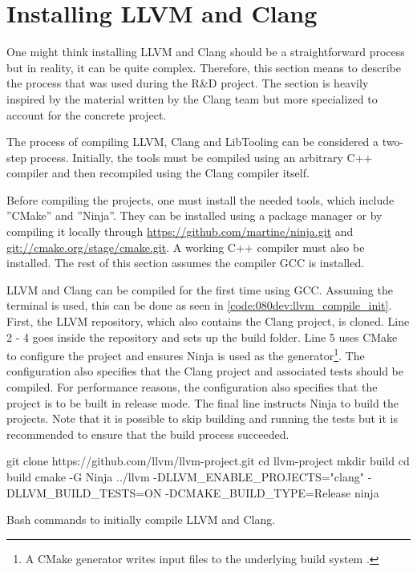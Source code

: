 \section{Installing LLVM and Clang}
One might think installing LLVM and Clang should be a straightforward process but in reality, it can be quite complex. Therefore, this section means to describe the process that was used during the R\&D project. The section is heavily inspired by the material written by the Clang team \cite{clangTutorialBuildingTools} but more specialized to account for the concrete project.

The process of compiling LLVM, Clang and LibTooling can be considered a two-step process. Initially, the tools must be compiled using an arbitrary C++ compiler and then recompiled using the Clang compiler itself.

Before compiling the projects, one must install the needed tools, which include ''CMake'' and ''Ninja''. They can be installed using a package manager or by compiling it locally through \url{https://github.com/martine/ninja.git} and \url{git://cmake.org/stage/cmake.git}. A working C++ compiler must also be installed. The rest of this section assumes the compiler GCC is installed.


LLVM and Clang can be compiled for the first time using GCC. Assuming the terminal is used, this can be done as seen in \cref{code:080dev:llvm_compile_init}.
First, the LLVM repository, which also contains the Clang project, is cloned.
Line 2 - 4 goes inside the repository and sets up the build folder.
Line 5 uses CMake to configure the project and ensures Ninja is used as the generator\footnote{A CMake generator writes input files to the underlying build system \cite{cmakeCmakegeneratorsCMake26}.}. The configuration also specifies that the Clang project and associated tests should be compiled. For performance reasons, the configuration also specifies that the project is to be built in release mode. The final line instructs Ninja to build the projects. Note that it is possible to skip building and running the tests but it is recommended to ensure that the build process succeeded.

\begin{listing}[H]
    \begin{bashcode}
git clone https://github.com/llvm/llvm-project.git
cd llvm-project
mkdir build
cd build
cmake -G Ninja ../llvm -DLLVM_ENABLE_PROJECTS="clang" -DLLVM_BUILD_TESTS=ON -DCMAKE_BUILD_TYPE=Release
ninja
    \end{bashcode}
    \caption{Bash commands to initially compile LLVM and Clang.}
    \label{code:080dev:llvm_compile_init}
\end{listing}

